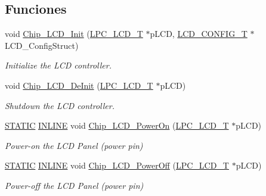 \subsection*{Funciones}
\begin{DoxyCompactItemize}
\item 
void \hyperlink{group___l_c_d__18_x_x__43_x_x_ga1674713116e590f51d61ea5d69d58314}{Chip\+\_\+\+L\+C\+D\+\_\+\+Init} (\hyperlink{struct_l_p_c___l_c_d___t}{L\+P\+C\+\_\+\+L\+C\+D\+\_\+T} $\ast$p\+L\+CD, \hyperlink{struct_l_c_d___c_o_n_f_i_g___t}{L\+C\+D\+\_\+\+C\+O\+N\+F\+I\+G\+\_\+T} $\ast$L\+C\+D\+\_\+\+Config\+Struct)
\begin{DoxyCompactList}\small\item\em Initialize the L\+CD controller. \end{DoxyCompactList}\item 
void \hyperlink{group___l_c_d__18_x_x__43_x_x_ga5f0cb4fb4a8dbd4544ec3686fede73a5}{Chip\+\_\+\+L\+C\+D\+\_\+\+De\+Init} (\hyperlink{struct_l_p_c___l_c_d___t}{L\+P\+C\+\_\+\+L\+C\+D\+\_\+T} $\ast$p\+L\+CD)
\begin{DoxyCompactList}\small\item\em Shutdown the L\+CD controller. \end{DoxyCompactList}\item 
\hyperlink{group___l_p_c___types___public___macros_ga10b2d890d871e1489bb02b7e70d9bdfb}{S\+T\+A\+T\+IC} \hyperlink{spifi__18xx__43xx_8h_a2eb6f9e0395b47b8d5e3eeae4fe0c116}{I\+N\+L\+I\+NE} void \hyperlink{group___l_c_d__18_x_x__43_x_x_ga06f07608827fe9ee120be6540922d16e}{Chip\+\_\+\+L\+C\+D\+\_\+\+Power\+On} (\hyperlink{struct_l_p_c___l_c_d___t}{L\+P\+C\+\_\+\+L\+C\+D\+\_\+T} $\ast$p\+L\+CD)
\begin{DoxyCompactList}\small\item\em Power-\/on the L\+CD Panel (power pin) \end{DoxyCompactList}\item 
\hyperlink{group___l_p_c___types___public___macros_ga10b2d890d871e1489bb02b7e70d9bdfb}{S\+T\+A\+T\+IC} \hyperlink{spifi__18xx__43xx_8h_a2eb6f9e0395b47b8d5e3eeae4fe0c116}{I\+N\+L\+I\+NE} void \hyperlink{group___l_c_d__18_x_x__43_x_x_ga993223c458c548b5e05705a9a5895228}{Chip\+\_\+\+L\+C\+D\+\_\+\+Power\+Off} (\hyperlink{struct_l_p_c___l_c_d___t}{L\+P\+C\+\_\+\+L\+C\+D\+\_\+T} $\ast$p\+L\+CD)
\begin{DoxyCompactList}\small\item\em Power-\/off the L\+CD Panel (power pin) \end{DoxyCompactList}\item 

\end{DoxyCompactItemize}
